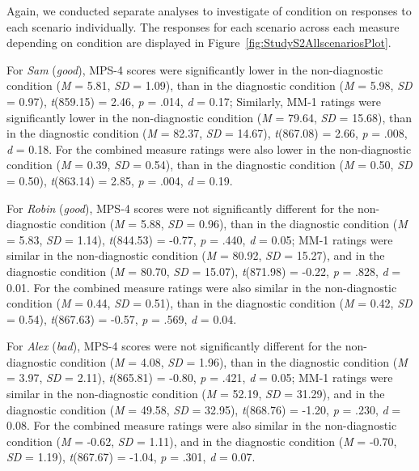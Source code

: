 \documentclass[
  man,floatsintext]{apa6}
\begin{document}
Again, we conducted separate analyses to investigate of condition on responses to each scenario individually. The responses for each scenario across each measure depending on condition are displayed in Figure~\ref{fig:StudyS2AllscenariosPlot}.

For \emph{Sam} (\emph{good}), MPS-4 scores were significantly lower in the non-diagnostic condition (\emph{M} = 5.81, \emph{SD} = 1.09), than in the diagnostic condition (\emph{M} = 5.98, \emph{SD} = 0.97), \emph{t}(859.15) = 2.46, \emph{p} = .014, \emph{d} = 0.17; Similarly, MM-1 ratings were significantly lower in the non-diagnostic condition (\emph{M} = 79.64, \emph{SD} = 15.68), than in the diagnostic condition (\emph{M} = 82.37, \emph{SD} = 14.67), \emph{t}(867.08) = 2.66, \emph{p} = .008, \emph{d} = 0.18. For the combined measure ratings were also lower in the non-diagnostic condition (\emph{M} = 0.39, \emph{SD} = 0.54), than in the diagnostic condition (\emph{M} = 0.50, \emph{SD} = 0.50), \emph{t}(863.14) = 2.85, \emph{p} = .004, \emph{d} = 0.19.

For \emph{Robin} (\emph{good}), MPS-4 scores were not significantly different for the non-diagnostic condition (\emph{M} = 5.88, \emph{SD} = 0.96), than in the diagnostic condition (\emph{M} = 5.83, \emph{SD} = 1.14), \emph{t}(844.53) = -0.77, \emph{p} = .440, \emph{d} = 0.05; MM-1 ratings were similar in the non-diagnostic condition (\emph{M} = 80.92, \emph{SD} = 15.27), and in the diagnostic condition (\emph{M} = 80.70, \emph{SD} = 15.07), \emph{t}(871.98) = -0.22, \emph{p} = .828, \emph{d} = 0.01. For the combined measure ratings were also similar in the non-diagnostic condition (\emph{M} = 0.44, \emph{SD} = 0.51), than in the diagnostic condition (\emph{M} = 0.42, \emph{SD} = 0.54), \emph{t}(867.63) = -0.57, \emph{p} = .569, \emph{d} = 0.04.

For \emph{Alex} (\emph{bad}), MPS-4 scores were not significantly different for the non-diagnostic condition (\emph{M} = 4.08, \emph{SD} = 1.96), than in the diagnostic condition (\emph{M} = 3.97, \emph{SD} = 2.11), \emph{t}(865.81) = -0.80, \emph{p} = .421, \emph{d} = 0.05; MM-1 ratings were similar in the non-diagnostic condition (\emph{M} = 52.19, \emph{SD} = 31.29), and in the diagnostic condition (\emph{M} = 49.58, \emph{SD} = 32.95), \emph{t}(868.76) = -1.20, \emph{p} = .230, \emph{d} = 0.08. For the combined measure ratings were also similar in the non-diagnostic condition (\emph{M} = -0.62, \emph{SD} = 1.11), and in the diagnostic condition (\emph{M} = -0.70, \emph{SD} = 1.19), \emph{t}(867.67) = -1.04, \emph{p} = .301, \emph{d} = 0.07.
\end{document}
